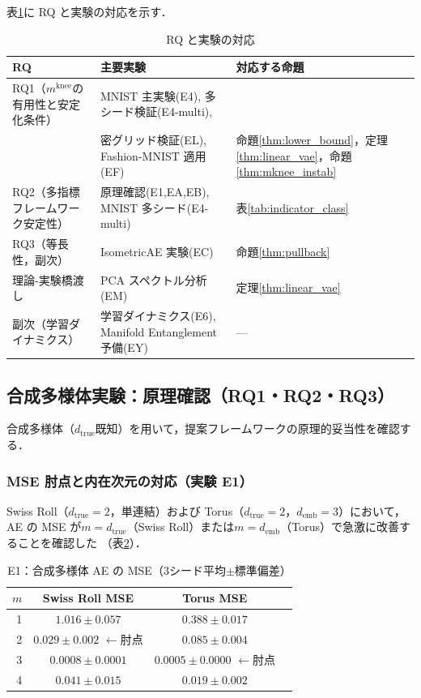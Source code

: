 \documentclass[11pt,a4paper]{jsarticle}
\newcommand{\dtrue}{d_{\mathrm{true}}}
\newcommand{\mknee}{m^{\mathrm{knee}}}
\newcommand{\demb}{d_{\mathrm{emb}}}
\begin{document}
表\ref{tab:rq_exp_map}に RQ と実験の対応を示す．

\begin{table}[H]
\centering
\caption{RQ と実験の対応}
\label{tab:rq_exp_map}
\small
\begin{tabular}{lll}
\toprule
RQ & 主要実験 & 対応する命題 \\
\midrule
RQ1（$\mknee$の有用性と安定化条件） & MNIST 主実験(E4), 多シード検証(E4-multi), & \\
 & 密グリッド検証(EL), Fashion-MNIST 適用(EF) & 命題\ref{thm:lower_bound}，定理\ref{thm:linear_vae}，命題\ref{thm:mknee_instab} \\
RQ2（多指標フレームワーク安定性） & 原理確認(E1,EA,EB), MNIST 多シード(E4-multi) & 表\ref{tab:indicator_class} \\
RQ3（等長性，副次） & IsometricAE 実験(EC) & 命題\ref{thm:pullback} \\
理論-実験橋渡し & PCA スペクトル分析(EM) & 定理\ref{thm:linear_vae} \\
副次（学習ダイナミクス） & 学習ダイナミクス(E6), Manifold Entanglement 予備(EY) & --- \\
\bottomrule
\end{tabular}
\end{table}

\subsection{合成多様体実験：原理確認（RQ1・RQ2・RQ3）}\label{sec:exp_synthetic}

合成多様体（$\dtrue$既知）を用いて，提案フレームワークの原理的妥当性を確認する．

\subsubsection{MSE 肘点と内在次元の対応（実験 E1）}

Swiss Roll（$\dtrue = 2$，単連結）および Torus（$\dtrue = 2$，$\demb = 3$）において，
AE の MSE が$m = \dtrue$（Swiss Roll）または$m = \demb$（Torus）で急激に改善することを確認した
（表\ref{tab:e1}）．

\begin{table}[H]
\centering
\caption{E1：合成多様体 AE の MSE（3シード平均$\pm$標準偏差）}
\label{tab:e1}
\small
\begin{tabular}{rccc}
\toprule
$m$ & Swiss Roll MSE & Torus MSE \\
\midrule
1 & $1.016\pm0.057$ & $0.388\pm0.017$ \\
2 & $\boldsymbol{0.029\pm0.002}$ $\leftarrow$肘点 & $0.085\pm0.004$ \\
3 & $0.0008\pm0.0001$ & $\boldsymbol{0.0005\pm0.0000}$ $\leftarrow$肘点 \\
4 & $0.041\pm0.015$ & $0.019\pm0.002$ \\
\bottomrule
\end{tabular}
\end{table}
\end{document}
